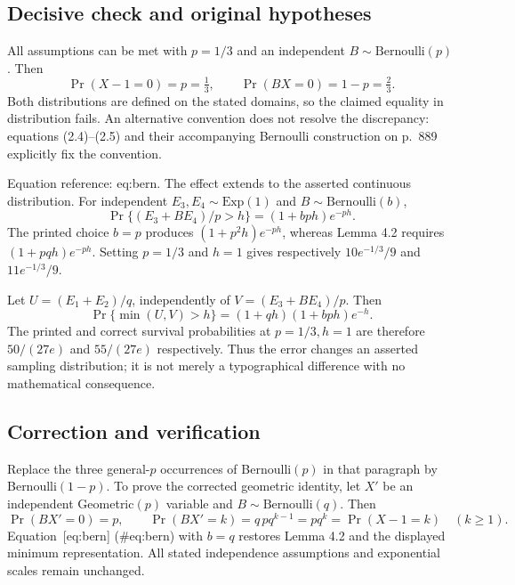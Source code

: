 \documentclass[10pt]{article}
\begin{document}
\subsection*{Decisive check and original hypotheses}
All assumptions can be met with \(p=1/3\) and an independent \(B\sim\mathrm{Bernoulli}(p)\). Then \[\Pr(X-1=0)=p=\tfrac13,\qquad
 \Pr(BX=0)=1-p=\tfrac23.\] Both distributions are defined on the stated domains, so the claimed equality in distribution fails. An alternative convention does not resolve the discrepancy: equations (2.4)–(2.5) and their accompanying Bernoulli construction on p. 889 explicitly fix the convention.\par
Equation reference: eq:bern. The effect extends to the asserted continuous distribution. For independent \(E_3,E_4\sim\mathrm{Exp}(1)\) and \(B\sim\mathrm{Bernoulli}(b)\), \[
 \Pr\{(E_3+B E_4)/p>h\}=(1+bph)e^{-ph}.\] The printed choice \(b=p\) produces \((1+p^2h)e^{-ph}\), whereas Lemma 4.2 requires \((1+pqh)e^{-ph}\). Setting \(p=1/3\) and \(h=1\) gives respectively \(10e^{-1/3}/9\) and \(11e^{-1/3}/9\).\par
Let \(U=(E_1+E_2)/q\), independently of \(V=(E_3+BE_4)/p\). Then \[\Pr\{\min(U,V)>h\}=(1+qh)(1+bph)e^{-h}.\] The printed and correct survival probabilities at \(p=1/3,h=1\) are therefore \(50/(27e)\) and \(55/(27e)\) respectively. Thus the error changes an asserted sampling distribution; it is not merely a typographical difference with no mathematical consequence.\par
\subsection*{Correction and verification}
Replace the three general-\(p\) occurrences of Bernoulli\((p)\) in that paragraph by Bernoulli\((1-p)\). To prove the corrected geometric identity, let \(X'\) be an independent Geometric\((p)\) variable and \(B\sim\mathrm{Bernoulli}(q)\). Then \[\Pr(BX'=0)=p,\qquad
 \Pr(BX'=k)=q\,p q^{k-1}=p q^k=\Pr(X-1=k)\quad(k\geq1).\] Equation [eq:bern] (\#eq:bern) with \(b=q\) restores Lemma 4.2 and the displayed minimum representation. All stated independence assumptions and exponential scales remain unchanged.\par
\end{document}
